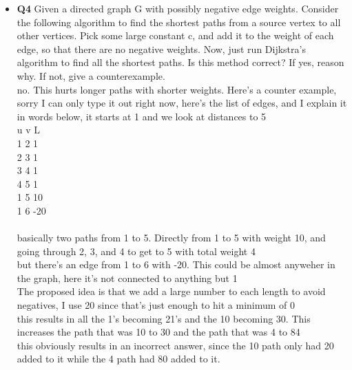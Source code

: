\documentclass[11pt]{article}
\begin{document}
\begin{itemize}
\item \textbf{Q4}
Given a directed graph G with possibly negative edge weights. Consider the following algorithm to find the shortest paths from a source vertex to all other vertices. Pick some large constant c, and add it to the weight of each edge, so that there are no negative weights. Now, just run Dijkstra’s algorithm to find all the shortest paths. Is this method correct? If yes, reason why. If not, give a counterexample.
\\no. This hurts longer paths with shorter weights. Here's a counter example, sorry I can only type it out right now, here's the list of edges, and I explain it in words below, it starts at 1 and we look at distances to 5
\\u v L
\\1 2 1
\\2 3 1
\\3 4 1
\\4 5 1
\\1 5 10
\\1 6 -20
\\
\\basically two paths from 1 to 5. Directly from 1 to 5 with weight 10, and going through 2, 3, and 4 to get to 5 with total weight 4
\\but there's an edge from 1 to 6 with -20. This could be almost anyweher in the graph, here it's not connected to anything but 1
\\The proposed idea is that we add a large number to each length to avoid negatives, I use 20 since that's just enough to hit a minimum of 0
\\this results in all the 1's becoming 21's  and the 10 becoming 30. This increases the path that was 10 to 30 and the path that was 4 to 84
\\this obviously results in an incorrect answer, since the 10 path only had 20 added to it while the 4 path had 80 added to it.


\end{itemize}
\end{document}
